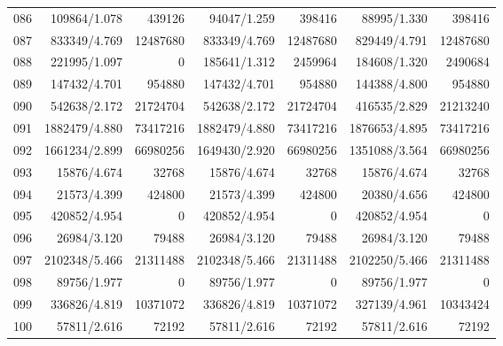 \begin{longtable}{crrrrrr}
086 & 109864/1.078 & 439126 & 94047/1.259 & 398416 & 88995/1.330 & 398416 \\
087 & 833349/4.769 & 12487680 & 833349/4.769 & 12487680 & 829449/4.791 & 12487680 \\
088 & 221995/1.097 & 0 & 185641/1.312 & 2459964 & 184608/1.320 & 2490684 \\
089 & 147432/4.701 & 954880 & 147432/4.701 & 954880 & 144388/4.800 & 954880 \\
090 & 542638/2.172 & 21724704 & 542638/2.172 & 21724704 & 416535/2.829 & 21213240 \\
091 & 1882479/4.880 & 73417216 & 1882479/4.880 & 73417216 & 1876653/4.895 & 73417216 \\
092 & 1661234/2.899 & 66980256 & 1649430/2.920 & 66980256 & 1351088/3.564 & 66980256 \\
093 & 15876/4.674 & 32768 & 15876/4.674 & 32768 & 15876/4.674 & 32768 \\
094 & 21573/4.399 & 424800 & 21573/4.399 & 424800 & 20380/4.656 & 424800 \\
095 & 420852/4.954 & 0 & 420852/4.954 & 0 & 420852/4.954 & 0 \\
096 & 26984/3.120 & 79488 & 26984/3.120 & 79488 & 26984/3.120 & 79488 \\
097 & 2102348/5.466 & 21311488 & 2102348/5.466 & 21311488 & 2102250/5.466 & 21311488 \\
098 & 89756/1.977 & 0 & 89756/1.977 & 0 & 89756/1.977 & 0 \\
099 & 336826/4.819 & 10371072 & 336826/4.819 & 10371072 & 327139/4.961 & 10343424 \\
100 & 57811/2.616 & 72192 & 57811/2.616 & 72192 & 57811/2.616 & 72192 \\
\end{longtable}
